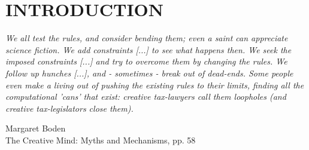 \section{INTRODUCTION} \normalfont 
\label{sec:intro}





\setlength{\epigraphwidth}{4in} 
\epigraph{\textit{We all test the rules, and consider bending them; even a saint can appreciate science fiction. We add constraints [...] to see what happens then. We seek the imposed constraints [...] and try to overcome them by changing the rules. We follow up hunches [...], and - sometimes - break out of dead-ends. Some people even make a living out of pushing the existing rules to their limits, finding all the computational 'cans' that exist: creative tax-lawyers call them loopholes (and creative tax-legislators close them).}}{Margaret Boden \\ The Creative Mind: Myths and Mechanisms, pp. 58}



\setlength{\parindent}{0.0em}


